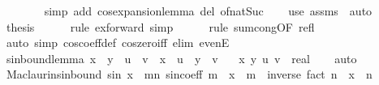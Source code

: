 \begin{isabellebody}
\ \ \ \ \ \ \isamarkupfalse%
\ {\isacharparenleft}{\kern0pt}simp\ add{\isacharcolon}{\kern0pt}\ cos{\isacharunderscore}{\kern0pt}expansion{\isacharunderscore}{\kern0pt}lemma\ del{\isacharcolon}{\kern0pt}\ of{\isacharunderscore}{\kern0pt}nat{\isacharunderscore}{\kern0pt}Suc{\isacharparenright}{\kern0pt}\isanewline
\ \ \isamarkupfalse%
\ {\isacharparenleft}{\kern0pt}use\ assms\ \ auto{\isacharparenright}{\kern0pt}\isanewline
\ \ \isamarkupfalse%
\ \isamarkupfalse%
\ {\isacharquery}{\kern0pt}thesis\isanewline
\ \ \ \ \isamarkupfalse%
\ {\isacharparenleft}{\kern0pt}rule\ ex{\isacharunderscore}{\kern0pt}forward{\isacharcomma}{\kern0pt}\ simp{\isacharparenright}{\kern0pt}\isanewline
\ \ \ \ \isamarkupfalse%
\ {\isacharparenleft}{\kern0pt}rule\ sum{\isachardot}{\kern0pt}cong{\isacharbrackleft}{\kern0pt}OF\ refl{\isacharbrackright}{\kern0pt}{\isacharparenright}{\kern0pt}\isanewline
\ \ \ \ \isamarkupfalse%
\ {\isacharparenleft}{\kern0pt}auto\ simp{\isacharcolon}{\kern0pt}\ cos{\isacharunderscore}{\kern0pt}coeff{\isacharunderscore}{\kern0pt}def\ cos{\isacharunderscore}{\kern0pt}zero{\isacharunderscore}{\kern0pt}iff\ elim{\isacharcolon}{\kern0pt}\ evenE{\isacharparenright}{\kern0pt}\isanewline
\ \ \ \ \isamarkupfalse%
\isanewline
{}\isamarkupfalse%
%
\endisatagproof
{\isafoldproof}%
%
\isadelimproof
\isanewline
%
\endisadelimproof
\isanewline
\isanewline
\isanewline
\isanewline
\isanewline
{}\isamarkupfalse%
\ sin{\isacharunderscore}{\kern0pt}bound{\isacharunderscore}{\kern0pt}lemma{\isacharcolon}{\kern0pt}\ {\isachardoublequoteopen}x\ {\isacharequal}{\kern0pt}\ y\ {\isasymLongrightarrow}\ {\isasymbar}u{\isasymbar}\ {\isasymle}\ v\ {\isasymLongrightarrow}\ {\isasymbar}{\isacharparenleft}{\kern0pt}x\ {\isacharplus}{\kern0pt}\ u{\isacharparenright}{\kern0pt}\ {\isacharminus}{\kern0pt}\ y{\isasymbar}\ {\isasymle}\ v{\isachardoublequoteclose}\isanewline
\ \ \ x\ y\ u\ v\ {\isacharcolon}{\kern0pt}{\isacharcolon}{\kern0pt}\ real\isanewline
%
\isadelimproof
\ \ %
\endisadelimproof
%
\isatagproof
{}\isamarkupfalse%
\ auto%
\endisatagproof
{\isafoldproof}%
%
\isadelimproof
\isanewline
%
\endisadelimproof
\isanewline
{}\isamarkupfalse%
\ Maclaurin{\isacharunderscore}{\kern0pt}sin{\isacharunderscore}{\kern0pt}bound{\isacharcolon}{\kern0pt}\ {\isachardoublequoteopen}{\isasymbar}sin\ x\ {\isacharminus}{\kern0pt}\ {\isacharparenleft}{\kern0pt}{\isasymSum}m{\isacharless}{\kern0pt}n{\isachardot}{\kern0pt}\ sin{\isacharunderscore}{\kern0pt}coeff\ m\ {\isacharasterisk}{\kern0pt}\ x\ {\isacharcircum}{\kern0pt}\ m{\isacharparenright}{\kern0pt}{\isasymbar}\ {\isasymle}\ inverse\ {\isacharparenleft}{\kern0pt}fact\ n{\isacharparenright}{\kern0pt}\ {\isacharasterisk}{\kern0pt}\ {\isasymbar}x{\isasymbar}\ {\isacharcircum}{\kern0pt}\ n{\isachardoublequoteclose}\isanewline

\end{isabellebody}
